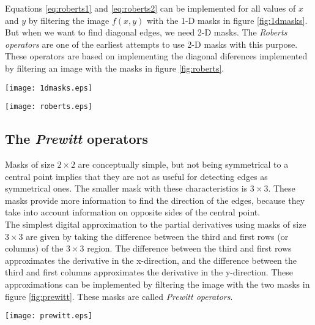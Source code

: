 \documentclass{ipol}
\numberwithin{equation}{section}
\numberwithin{table}{section}
\numberwithin{figure}{section}
\begin{document}
Equations \ref{eq:roberts1} and \ref{eq:roberts2} can be implemented for all values of $x$ and $y$
by filtering the image $f(x,y)$ with the 1-D masks in figure \ref{fig:1dmasks}. But when we want 
to find diagonal edges, we need 2-D masks. The \textit{Roberts operators} are one of the earliest 
attempts to use 2-D masks with this purpose. These operators are based on implementing the diagonal 
diferences implemented by filtering an image with the masks in figure \ref{fig:roberts}.\\

\begin{SCfigure}[3][!h]
	\centering
	\texttt{[image: 1dmasks.eps]}
	\caption{One-dimensional masks used to implement equations \ref{eq:roberts1} and \ref{eq:roberts2}.}
	\label{fig:1dmasks}
\end{SCfigure}

\begin{SCfigure}[3][!h]
	\centering
	\texttt{[image: roberts.eps]}
	\caption{\textit{Roberts cross-gradient} 2-D masks.}
	\label{fig:roberts}
\end{SCfigure}

\subsection{The \textit{Prewitt} operators}

Masks of size $2\times2$ are conceptually simple, but not being symmetrical to a central point implies 
that they are not as useful for detecting edges as symmetrical ones. The smaller mask with these characteristics is 
$3\times3$. These masks provide more information to find the direction of the edges, because they take 
into account information on opposite sides of the central point.\\

The simplest digital approximation to the partial derivatives using masks of size $3\times3$ are given 
by taking the difference between the third and first rows (or columns) of the $3\times3$ region. The
difference between the third and first rows approximates the derivative in the x-direction, and 
the difference between the third and first columns approximates the derivative in the y-direction.
These approximations can be implemented by filtering the image with the two masks in figure \ref{fig:prewitt}.
These masks are called \textit{Prewitt operators}.\\

\begin{SCfigure}[2][!h]
	\centering
	\texttt{[image: prewitt.eps]}
	\caption{\textit{Prewitt} 2-D masks of size $3\times3$.}
	\label{fig:prewitt}
\end{SCfigure}
\end{document}
